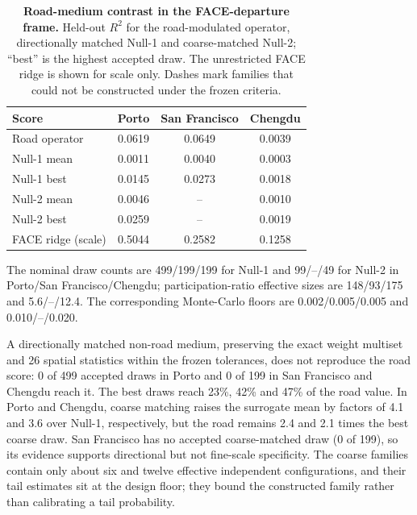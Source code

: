 \begin{table}[!htbp]
\centering\small
\caption{\textbf{Road-medium contrast in the FACE-departure frame.} Held-out $R^2$ for the road-modulated operator, directionally matched Null-1 and coarse-matched Null-2; ``best'' is the highest accepted draw. The unrestricted FACE ridge is shown for scale only. Dashes mark families that could not be constructed under the frozen criteria.}
\label{tab:supp-roadmedium}
\begin{tabular}{lccc}
\toprule
Score & Porto & San Francisco & Chengdu \\
\midrule
Road operator & 0.0619 & 0.0649 & 0.0039 \\
Null-1 mean & 0.0011 & 0.0040 & 0.0003 \\
Null-1 best & 0.0145 & 0.0273 & 0.0018 \\
Null-2 mean & 0.0046 & -- & 0.0010 \\
Null-2 best & 0.0259 & -- & 0.0019 \\
FACE ridge (scale) & 0.5044 & 0.2582 & 0.1258 \\
\bottomrule
\end{tabular}
\end{table}

The nominal draw counts are 499/199/199 for Null-1 and 99/--/49 for Null-2 in Porto/San Francisco/Chengdu; participation-ratio effective sizes are 148/93/175 and 5.6/--/12.4. The corresponding Monte-Carlo floors are 0.002/0.005/0.005 and 0.010/--/0.020.

A directionally matched non-road medium, preserving the exact weight multiset and 26 spatial statistics within the frozen tolerances, does not reproduce the road score: 0 of 499 accepted draws in Porto and 0 of 199 in San Francisco and Chengdu reach it. The best draws reach 23\%, 42\% and 47\% of the road value. In Porto and Chengdu, coarse matching raises the surrogate mean by factors of 4.1 and 3.6 over Null-1, respectively, but the road remains 2.4 and 2.1 times the best coarse draw. San Francisco has no accepted coarse-matched draw (0 of 199), so its evidence supports directional but not fine-scale specificity. The coarse families contain only about six and twelve effective independent configurations, and their tail estimates sit at the design floor; they bound the constructed family rather than calibrating a tail probability.


